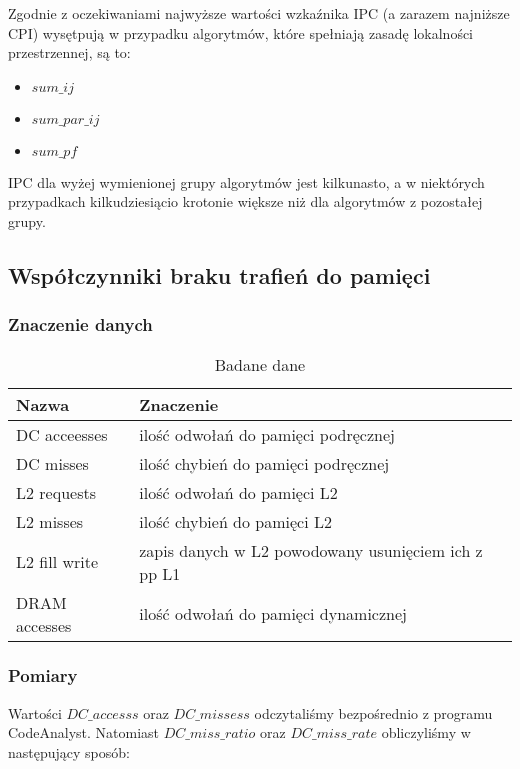 Zgodnie z oczekiwaniami najwyższe wartości wzkaźnika IPC (a zarazem najniższe CPI) wysętpują w przypadku algorytmów, które spełniają zasadę lokalności przestrzennej, są to:
\begin{itemize}
\item $sum\_ij$
\item $sum\_par\_ij$
\item $sum\_pf$
\end{itemize}

IPC dla wyżej wymienionej grupy algorytmów jest kilkunasto, a w niektórych przypadkach kilkudziesiącio krotonie większe niż dla algorytmów z pozostałej grupy.

\subsection{Współczynniki braku trafień do pamięci}
\label{sec:trafienia}

\subsubsection{Znaczenie danych}

\begin{table}[H]
\centering
\begin{tabular}{|l|l|}
\hline
Nazwa & Znaczenie \\ \hline
DC acceesses & ilość odwołań do pamięci podręcznej \\ \hline
DC misses & ilość chybień do pamięci podręcznej \\ \hline
L2 requests & ilość odwołań do pamięci L2 \\ \hline
L2 misses & ilość chybień do pamięci L2 \\ \hline
L2 fill write & zapis danych w L2 powodowany usunięciem ich z pp L1 \\ \hline
DRAM accesses & ilość odwołań do pamięci dynamicznej \\ \hline
\end{tabular}
\caption{Badane dane}
\end{table}


\subsubsection{Pomiary}

Wartości $DC\_accesss$ oraz $DC\_missess$ odczytaliśmy bezpośrednio z programu CodeAnalyst. Natomiast $DC\_miss\_ratio$ oraz $DC\_miss\_rate$ obliczyliśmy w następujący sposób:

